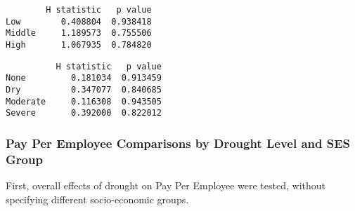 \documentclass[11pt]{article}
\begin{document}
    
    \begin{verbatim}
        H statistic   p value
Low        0.408804  0.938418
Middle     1.189573  0.755506
High       1.067935  0.784820
    \end{verbatim}

    
    
    \begin{verbatim}
          H statistic   p value
None         0.181034  0.913459
Dry          0.347077  0.840685
Moderate     0.116308  0.943505
Severe       0.392000  0.822012
    \end{verbatim}

    
    \hypertarget{pay-per-employee-comparisons-by-drought-level-and-ses-group}{%
\subsubsection{Pay Per Employee Comparisons by Drought Level and SES
Group}\label{pay-per-employee-comparisons-by-drought-level-and-ses-group}}

    First, overall effects of drought on Pay Per Employee were tested,
without specifying different socio-economic groups.
\end{document}

